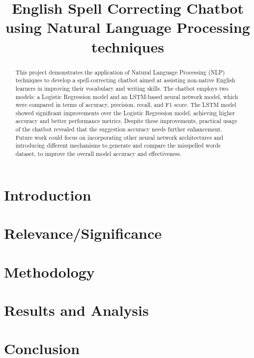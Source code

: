 \documentclass[conference]{IEEEtran}
\begin{document}
\title{English Spell Correcting Chatbot using Natural Language Processing techniques}

\author{
}

\maketitle

\begin{abstract}
  This project demonstrates the application of Natural Language Processing (NLP) techniques to develop a spell-correcting chatbot aimed at assisting non-native English learners in improving their vocabulary and writing skills. The chatbot employs two models: a Logistic Regression model and an LSTM-based neural network model, which were compared in terms of accuracy, precision, recall, and F1 score. The LSTM model showed significant improvements over the Logistic Regression model, achieving higher accuracy and better performance metrics. Despite these improvements, practical usage of the chatbot revealed that the suggestion accuracy needs further enhancement. Future work could focus on incorporating other neural network architectures and introducing different mechanisms to generate and compare the misspelled words dataset, to improve the overall model accuracy and effectiveness.
\end{abstract}

\section{Introduction}


\section{Relevance/Significance}


\section{Methodology}


\section{Results and Analysis}


\section{Conclusion}




\end{document}
